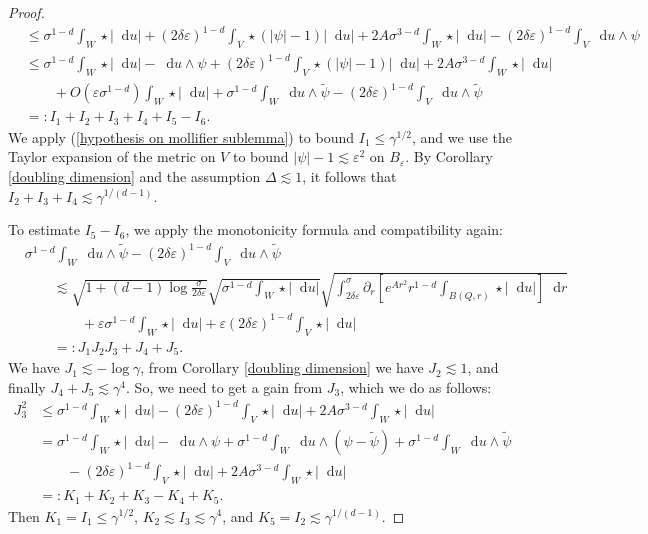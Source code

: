 \documentclass[reqno,10pt]{amsart}
\newcommand*\dif{\mathop{}\!\mathrm{d}}
\theoremstyle{definition}
\numberwithin{equation}{section}
\begin{document}
\begin{proof}
\begin{align*}
&\leq \sigma^{1 - d}\int_W \star |\dif u| + (2\delta\varepsilon)^{1 - d} \int_V \star(|\psi| - 1)|\dif u| + 2A\sigma^{3 - d} \int_W \star |\dif u| - (2\delta\varepsilon)^{1 - d}\int_V \dif u \wedge \psi\\
&\leq \sigma^{1 - d}\int_W \star |\dif u| - \dif u \wedge \psi + (2\delta\varepsilon)^{1 - d} \int_V \star(|\psi| - 1)|\dif u| + 2A\sigma^{3 - d} \int_W \star |\dif u| \\
&\qquad + O(\varepsilon \sigma^{1 - d}) \int_W \star |\dif u| + \sigma^{1 - d}\int_W \dif u \wedge \tilde \psi - (2\delta\varepsilon)^{1 - d}\int_V \dif u \wedge \tilde \psi\\
&=: I_1 + I_2 + I_3 + I_4 + I_5 - I_6.
\end{align*}
We apply (\ref{hypothesis on mollifier sublemma}) to bound $I_1 \leq \gamma^{1/2}$, and we use the Taylor expansion of the metric on $V$ to bound $|\psi| - 1 \lesssim \varepsilon^2$ on $B_\varepsilon$.
By Corollary \ref{doubling dimension} and the assumption $\Delta \lesssim 1$, it follows that $I_2 + I_3 + I_4 \lesssim \gamma^{1/(d - 1)}$.

To estimate $I_5 - I_6$, we apply the monotonicity formula and compatibility again:
\begin{align*}
&\sigma^{1 - d} \int_W \dif u \wedge \tilde \psi - (2\delta\varepsilon)^{1 - d} \int_V \dif u \wedge \tilde \psi \\
&\qquad \lesssim \sqrt{1 + (d - 1) \log \frac{\sigma}{2\delta\varepsilon}} \sqrt{\sigma^{1 - d} \int_W \star |\dif u|} \sqrt{\int_{2\delta\varepsilon}^\sigma \partial_r \left[e^{Ar^2} r^{1 - d} \int_{B(Q, r)} \star |\dif u|\right] \dif r}\\
&\qquad \qquad + \varepsilon \sigma^{1 - d} \int_W \star |\dif u| + \varepsilon (2\delta\varepsilon)^{1 - d} \int_V \star |\dif u| \\
&\qquad =: J_1 J_2 J_3 + J_4 + J_5.
\end{align*}
We have $J_1 \lesssim -\log \gamma$, from Corollary \ref{doubling dimension} we have $J_2 \lesssim 1$, and finally $J_4 + J_5 \lesssim \gamma^4$.
So, we need to get a gain from $J_3$, which we do as follows:
\begin{align*}
J_3^2 &\leq \sigma^{1 - d} \int_W \star |\dif u| - (2 \delta \varepsilon)^{1 - d} \int_V \star |\dif u| + 2A\sigma^{3 - d} \int_W \star |\dif u| \\
&= \sigma^{1 - d} \int_W \star |\dif u| - \dif u \wedge \psi + \sigma^{1 - d} \int_W \dif u \wedge (\psi - \tilde \psi) + \sigma^{1 - d} \int_W \dif u \wedge \tilde \psi \\
&\qquad - (2 \delta\varepsilon)^{1 - d} \int_V \star |\dif u| + 2A \sigma^{3 - d} \int_W \star |\dif u| \\
&=: K_1 + K_2 + K_3 - K_4 + K_5.
\end{align*}
Then $K_1 = I_1 \leq \gamma^{1/2}$, $K_2 \lesssim I_3 \lesssim \gamma^4$, and $K_5 = I_2 \lesssim \gamma^{1/(d - 1)}$.


\end{proof}
\end{document}
